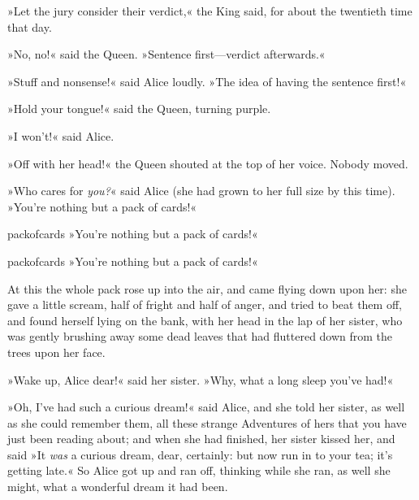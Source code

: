 »Let the jury consider their verdict,« the King said, for about the twentieth time that day.

»No, no!« said the Queen. »Sentence first—verdict afterwards.«

»Stuff and nonsense!« said Alice loudly. »The idea of having the sentence first!«

»Hold your tongue!« said the Queen, turning purple.

»I won't!« said Alice.

»Off with her head!« the Queen shouted at the top of her voice. Nobody moved.

»Who cares for \textit{you?}« said Alice (she had grown to her full size by this time). »You're nothing but a pack of cards!«

\begin{pictures}
	\begin{letter}
		\begin{colorbigpic}
			[1.1]
			{packofcards}
			{»You're nothing but a pack of cards!«}
		\end{colorbigpic}
	\end{letter}
	
	\begin{a4}
		\begin{colorbigpic}
			[1.0]
			{packofcards}
			{»You're nothing but a pack of cards!«}
		\end{colorbigpic}
	\end{a4}	
\end{pictures}


At this the whole pack rose up into the air, and came flying down upon her: she gave a little scream, half of fright and half of anger, and tried to beat them off, and found herself lying on the bank, with her head in the lap of her sister, who was gently brushing away some dead leaves that had fluttered down from the trees upon her face.

»Wake up, Alice dear!« said her sister. »Why, what a long sleep you've had!«

»Oh, I've had such a curious dream!« said Alice, and she told her sister, as well as she could remember them, all these strange Adventures of hers that you have just been reading about; and when she had finished, her sister kissed her, and said »It \textit{was} a curious dream, dear, certainly: but now run in to your tea; it's getting late.« So Alice got up and ran off, thinking while she ran, as well she might, what a wonderful dream it had been.


\divider




